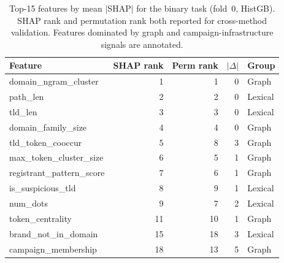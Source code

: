 \begin{table}[htbp]
\centering
\caption{Top-15 features by mean $|$SHAP$|$ for the binary task (fold~0, HistGB). SHAP rank and permutation rank both reported for cross-method validation. Features dominated by graph and campaign-infrastructure signals are annotated.}
\label{tab:shap_top_binary}
\footnotesize
\begin{tabular}{lrrrl}
\toprule
Feature & SHAP rank & Perm rank & $|\Delta|$ & Group \\
\midrule
domain\_ngram\_cluster & 1 & 1 & 0 & Graph \\
path\_len & 2 & 2 & 0 & Lexical \\
tld\_len & 3 & 3 & 0 & Lexical \\
domain\_family\_size & 4 & 4 & 0 & Graph \\
tld\_token\_cooccur & 5 & 8 & 3 & Graph \\
max\_token\_cluster\_size & 6 & 5 & 1 & Graph \\
registrant\_pattern\_score & 7 & 6 & 1 & Graph \\
is\_suspicious\_tld & 8 & 9 & 1 & Lexical \\
num\_dots & 9 & 7 & 2 & Lexical \\
token\_centrality & 11 & 10 & 1 & Graph \\
brand\_not\_in\_domain & 15 & 18 & 3 & Lexical \\
campaign\_membership & 18 & 13 & 5 & Graph \\
\bottomrule
\end{tabular}
\end{table}